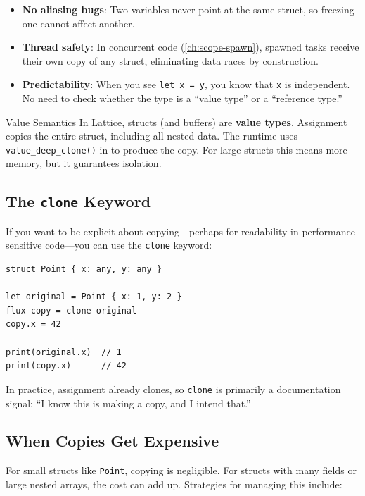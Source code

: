 \begin{itemize}
  \item \textbf{No aliasing bugs}: Two variables never point at the same
    struct, so freezing one cannot affect another.
  \item \textbf{Thread safety}: In concurrent code (\cref{ch:scope-spawn}),
    spawned tasks receive their own copy of any struct, eliminating data
    races by construction.
  \item \textbf{Predictability}: When you see \lstinline|let x = y|, you
    know that \lstinline|x| is independent. No need to check whether the
    type is a ``value type'' or a ``reference type.''
\end{itemize}

\begin{defnbox}{Value Semantics}
In Lattice, structs (and buffers) are \textbf{value types}. Assignment copies
the entire struct, including all nested data. The runtime uses
\texttt{value\_deep\_clone()} in  to produce the
copy. For large structs this means more memory, but it guarantees isolation.
\end{defnbox}

\subsection{The \texttt{clone} Keyword}

If you want to be explicit about copying---perhaps for readability in
performance-sensitive code---you can use the \lstinline|clone| keyword:

\begin{lstlisting}[language=Lattice, caption={Explicit cloning}]
struct Point { x: any, y: any }

let original = Point { x: 1, y: 2 }
flux copy = clone original
copy.x = 42

print(original.x)  // 1
print(copy.x)      // 42
\end{lstlisting}

In practice, assignment already clones, so \lstinline|clone| is primarily
a documentation signal: ``I know this is making a copy, and I intend that.''

\subsection{When Copies Get Expensive}

For small structs like \lstinline|Point|, copying is negligible. For structs
with many fields or large nested arrays, the cost can add up. Strategies for
managing this include:

